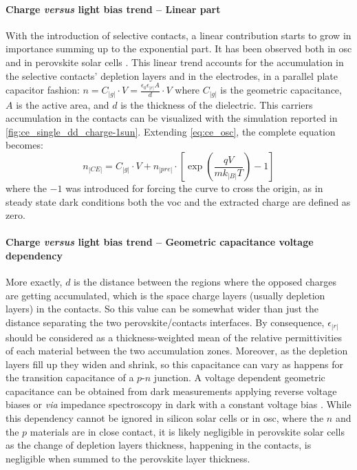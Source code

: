 		\paragraph{Charge \textit{versus} light bias trend -- Linear part}
		With the introduction of selective contacts, a linear contribution starts to grow in importance summing up to the exponential part.
		It has been observed both in \gls{osc} \cite{Ryan2017a,Credgington2014} and in perovskite solar cells \cite{Gelmetti2017,Wheeler2017,Du2018}.
		This linear trend accounts for the accumulation in the selective contacts' depletion layers and in the electrodes, in a parallel plate capacitor fashion: $n = C_|g| \cdot V = \frac{\epsilon_0 \epsilon_|r| A}{d} \cdot V$ where $C_|g|$ is the geometric capacitance, $A$ is the active area, and $d$ is the thickness of the dielectric.
		This carriers accumulation in the contacts can be visualized with the simulation reported in \cref{fig:ce_single_dd_charge-1sun}.
		Extending \cref{eq:ce_osc}, the complete equation becomes:
		\begin{equation}\label{eq:ce_full}
			n_|CE| = C_|g| \cdot V + n_|pre| \cdot \left[\exp(\frac{qV}{mk_|B|T}) - 1\right]
		\end{equation}
		where the $-1$ was introduced for forcing the curve to cross the origin, as in steady state dark conditions both the \gls{voc} and the extracted charge are defined as zero.
		
		\paragraph{Charge \textit{versus} light bias trend -- Geometric capacitance voltage dependency}
		More exactly, $d$ is the distance between the regions where the opposed charges are getting accumulated, which is the space charge layers (usually depletion layers) in the contacts.
		So this value can be somewhat wider than just the distance separating the two perovskite/contacts interfaces.
		By consequence, $\epsilon_|r|$ should be considered as a thickness-weighted mean of the relative permittivities of each material between the two accumulation zones.
		Moreover, as the depletion layers fill up they widen and shrink, so this capacitance can vary as happens for the transition capacitance of a $p$-$n$ junction.
		A voltage dependent geometric capacitance can be obtained from dark  measurements applying reverse voltage biases \cite{Kiermasch2018} or \textit{via} impedance spectroscopy in dark with a constant voltage bias \cite{Brus2016,Pockett2015}.
		While this dependency cannot be ignored in silicon solar cells or in \gls{osc}, where the $n$ and the $p$ materials are in close contact, it is likely negligible in perovskite solar cells as the change of depletion layers thickness, happening in the contacts, is negligible when summed to the perovskite layer thickness.

